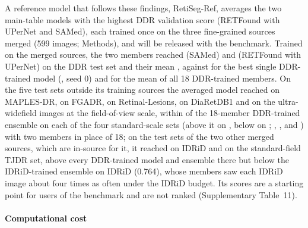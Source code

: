 A reference model that follows these findings, RetiSeg-Ref, averages the two main-table models with the highest DDR validation score (RETFound with UPerNet and SAMed), each trained once on the three fine-grained sources merged (599 images; Methods), and will be released with the benchmark. Trained on the merged sources, the two members reached  (SAMed) and  (RETFound with UPerNet) on the DDR test set and their mean , against  for the best single DDR-trained model (, seed 0) and  for the mean of all 18 DDR-trained members. On the five test sets outside its training sources the averaged model reached  on MAPLES-DR,  on FGADR,  on Retinal-Lesions,  on DiaRetDB1 and  on the ultra-widefield images at the field-of-view scale, within  of the 18-member DDR-trained ensemble on each of the four standard-scale sets (above it on , below on ; , ,  and ) with two members in place of 18; on the test sets of the two other merged sources, which are in-source for it, it reached  on IDRiD and  on the standard-field TJDR set, above every DDR-trained model and ensemble there but below the IDRiD-trained ensemble on IDRiD (0.764), whose members saw each IDRiD image about four times as often under the IDRiD budget. Its scores are a starting point for users of the benchmark and are not ranked (Supplementary Table~11).

\paragraph{Computational cost}

